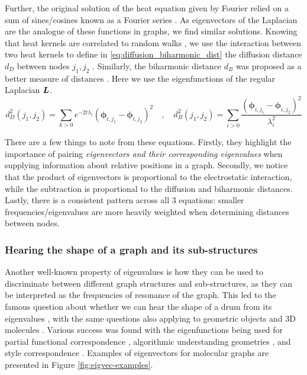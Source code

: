 \documentclass{article}
\def\eigvec{{\bm{\phi}}}
\begin{document}
Further, the original solution of the heat equation given by Fourier relied on a sum of sines/cosines known as a Fourier series \cite{cajori1999history}. As eigenvectors of the Laplacian are the analogue of these functions in graphs, we find similar solutions. Knowing that heat kernels are correlated to random walks \cite{bronstein_geometric_2017, beaini_directional_2021}, we use the interaction between two heat kernels to define in \eqref{eq:diffusion_biharmonic_dist} the diffusion distance $d_D$ between nodes $j_1, j_2$ \cite{bronstein_geometric_2017, COIFMAN20065}. Similarly, the biharmonic distance $d_B$ was proposed as a better measure of distances \cite{lipman_2010_biharmonic}. Here we use the eigenfunctions of the regular Laplacian ${\bm{L}}$. 
\begin{equation}
\label{eq:diffusion_biharmonic_dist}
d_D^2(j_1,j_2) = 
    \sum_{k>0}{e^{-2 t \lambda_i}
    (\eigvec_{i,j_1} - \eigvec_{i,j_2})^2} 
\quad,\quad
d_B^2(j_1, j_2) = 
    \sum_{i>0}
    \frac{(\eigvec_{i,j_1} - \eigvec_{i,j_2})^2}
    {\lambda_i^2}
\end{equation}

There are a few things to note from these equations. Firstly, they highlight the importance of pairing \textit{eigenvectors and their corresponding eigenvalues} when supplying information about relative positions in a graph. Secondly, we notice that the product of eigenvectors is proportional to the electrostatic interaction, while the subtraction is proportional to the diffusion and biharmonic distances. Lastly, there is a consistent pattern across all 3 equations: smaller frequencies/eigenvalues are more heavily weighted when determining distances between nodes.

\subsubsection{Hearing the shape of a graph and its sub-structures}

Another well-known property of eigenvalues is how they can be used to discriminate between different graph structures and sub-structures, as they can be interpreted as the frequencies of resonance of the graph. This led to the famous question about whether we can hear the shape of a drum from its eigenvalues \cite{kac_can_1966}, with the same questions also applying to geometric objects \cite{cosmo_isospectralization_2019} and 3D molecules \cite{schrier_can_2020}. Various success was found with the eigenfunctions being used for partial functional correspondence \cite{rodola_partial_2015}, algorithmic understanding geometries \cite{levy_laplace_beltrami_2006}, and style correspondence \cite{cosmo_isospectralization_2019}. Examples of eigenvectors for molecular graphs are presented in Figure \ref{fig:eigvec-examples}.
\end{document}
